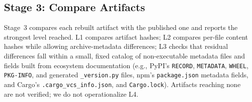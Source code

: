 

 
\subsection{Stage 3: Compare Artifacts}
\label{subsec:stage-3}

Stage~3 compares each rebuilt artifact with the published one and reports the strongest level reached. L1 compares artifact hashes; L2 compares per-file content hashes while allowing archive-metadata differences; L3 checks that residual differences fall within a small, fixed catalog of non-executable metadata files and fields built from ecosystem documentation (e.g., PyPI's \texttt{RECORD}, \texttt{METADATA}, \texttt{WHEEL}, \texttt{PKG-INFO}, and generated \texttt{\_version.py} files, npm's \texttt{package.json} metadata fields, and Cargo's \texttt{.cargo\_vcs\_info.json}, and \texttt{Cargo.lock}). Artifacts reaching none are not verified; we do not operationalize L4.

